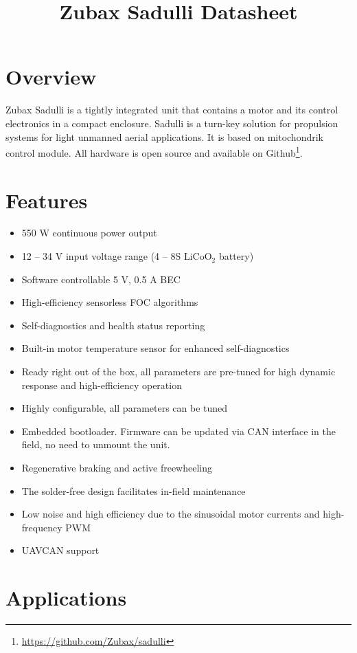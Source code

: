 \documentclass{document_templates/documentation_template_latex/zubaxdoc}
\title{Zubax Sadulli Datasheet}
\begin{document}
\frontmatter
\begin{titlepage}

\section*{Overview}

Zubax Sadulli is a tightly integrated unit that contains a motor and its control electronics in a compact enclosure.
Sadulli is a turn-key solution for propulsion systems for light unmanned aerial applications.
It is based on \mbox{mitochondrik} control module.
All hardware is open source and available on Github\footnote{\url{https://github.com/Zubax/sadulli}}.

\section*{Features}

\begin{itemize}
    \item 550 W continuous power output
    \item 12 -- 34 V input voltage range (4 -- 8S $\text{LiCoO}_\text{2}$ battery)
    \item Software controllable 5 V, 0.5 A BEC
    \item High-efficiency sensorless FOC algorithms
    \item Self-diagnostics and health status reporting
    \item Built-in motor temperature sensor for enhanced self-diagnostics
    \item Ready right out of the box, all parameters are pre-tuned for high dynamic response and high-efficiency operation
    \item Highly configurable, all parameters can be tuned
    \item Embedded bootloader. Firmware can be updated via CAN interface in the field, no need to unmount the unit.
    \item Regenerative braking and active freewheeling
    \item The solder-free design facilitates in-field maintenance
    \item Low noise and high efficiency due to the sinusoidal \mbox{motor} currents and high-frequency PWM
    \item UAVCAN support
\end{itemize}

\section*{Applications}


\end{titlepage}
\end{document}
